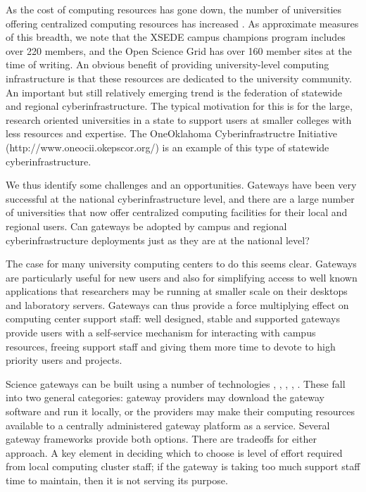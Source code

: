\documentclass[sigconf]{acmart}
\begin{document}
As the cost of computing resources has gone down, the number of universities offering centralized computing resources has increased \cite{hacker2007making}. As approximate measures of this breadth, we note that the XSEDE campus champions program includes over 220 members, and the Open Science Grid has over 160 member sites at the time of writing. An obvious benefit of providing university-level computing infrastructure is that these resources are dedicated to the university community. An important but still relatively emerging trend is the federation of statewide and regional cyberinfrastructure. The typical motivation for this is for the large, research oriented universities in a state to support users at smaller colleges with less resources and expertise. The OneOklahoma Cyberinfrastructre Initiative (http://www.oneocii.okepscor.org/) is an example of this type of statewide cyberinfrastructure.

We thus identify some challenges and an opportunities. Gateways have been very successful at the national cyberinfrastructure level, and there are a large number of universities that now offer centralized computing facilities for their local and regional users. Can gateways be adopted by campus and regional cyberinfrastructure deployments just as they are at the national level?  

The case for many university computing centers to do this seems clear. Gateways are particularly useful for new users and also for simplifying access to well known applications that researchers may be running at smaller scale on their desktops and laboratory servers.  Gateways can thus provide a force multiplying effect on computing center support staff: well designed, stable and supported gateways provide users with a self-service mechanism for interacting with campus resources, freeing support staff and giving them more time to devote to high priority users and projects. 

Science gateways can be built using a number of technologies \cite{mclennan2010hubzero}, \cite{dooley2012software}, \cite{marru2011apache}, \cite{goecks2010galaxy}, \cite{kluyver2016jupyter}.  These fall into two general categories: gateway providers may download the gateway software and run it locally, or the providers may make their computing resources available to a centrally administered gateway platform as a service. Several gateway frameworks provide both options.  There are tradeoffs for either approach. A key element in deciding which to choose is level of effort required from local computing cluster staff; if the gateway is taking too much support staff time to maintain, then it is not serving its purpose. 
\end{document}
